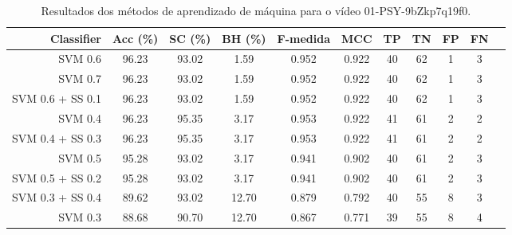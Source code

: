 \begin{table}[!htb]
\centering
\caption{Resultados dos métodos de aprendizado de máquina para o vídeo 01-PSY-9bZkp7q19f0.}
\label{tab:01-PSY-9bZkp7q19f0}
\begin{tabular}{r|c|c|c|c|c|c|c|c|c|c}
\hline\hline
Classifier & Acc (\%) & SC (\%) & BH (\%) & F-medida & MCC & TP & TN & FP & FN \\ \hline
SVM 0.6 & 96.23 & 93.02 & 1.59 & 0.952 & 0.922 & 40 & 62 & 1 & 3 \\ 
SVM 0.7 & 96.23 & 93.02 & 1.59 & 0.952 & 0.922 & 40 & 62 & 1 & 3 \\ 
SVM 0.6 + SS 0.1 & 96.23 & 93.02 & 1.59 & 0.952 & 0.922 & 40 & 62 & 1 & 3 \\ 
SVM 0.4 & 96.23 & 95.35 & 3.17 & 0.953 & 0.922 & 41 & 61 & 2 & 2 \\ 
SVM 0.4 + SS 0.3 & 96.23 & 95.35 & 3.17 & 0.953 & 0.922 & 41 & 61 & 2 & 2 \\ 
SVM 0.5 & 95.28 & 93.02 & 3.17 & 0.941 & 0.902 & 40 & 61 & 2 & 3 \\ 
SVM 0.5 + SS 0.2 & 95.28 & 93.02 & 3.17 & 0.941 & 0.902 & 40 & 61 & 2 & 3 \\ 
SVM 0.3 + SS 0.4 & 89.62 & 93.02 & 12.70 & 0.879 & 0.792 & 40 & 55 & 8 & 3 \\ 
SVM 0.3 & 88.68 & 90.70 & 12.70 & 0.867 & 0.771 & 39 & 55 & 8 & 4 \\ 
\hline\hline
\end{tabular}
\end{table}
